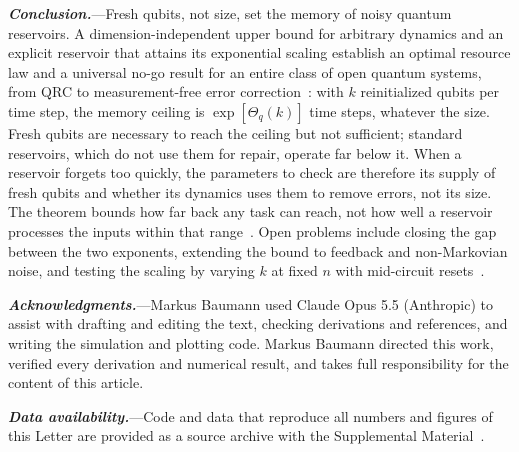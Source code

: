 \documentclass[aps,prl,twocolumn,superscriptaddress,floatfix]{revtex4-2}
\theoremstyle{plain}
\newcommand{\runin}[1]{\textit{\textbf{#1}}---}
\begin{document}
\runin{Conclusion.}Fresh qubits, not size, set the memory of noisy quantum reservoirs. A dimension-independent upper bound for arbitrary dynamics and an explicit reservoir that attains its exponential scaling establish an optimal resource law and a universal no-go result for an entire class of open quantum systems, from QRC to measurement-free error correction~\cite{Heussen2024}: with $k$ reinitialized qubits per time step, the memory ceiling is $\exp[\Theta_q(k)]$ time steps, whatever the size. Fresh qubits are necessary to reach the ceiling but not sufficient; standard reservoirs, which do not use them for repair, operate far below it. When a reservoir forgets too quickly, the parameters to check are therefore its supply of fresh qubits and whether its dynamics uses them to remove errors, not its size. The theorem bounds how far back any task can reach, not how well a reservoir processes the inputs within that range~\cite{Cao2026}. Open problems include closing the gap between the two exponents, extending the bound to feedback and non-Markovian noise, and testing the scaling by varying $k$ at fixed $n$ with mid-circuit resets~\cite{Yasuda2023,Hu2024}.

\begin{acknowledgments}
\runin{Acknowledgments.}Markus Baumann used Claude Opus 5.5 (Anthropic) to assist with drafting and editing the text, checking derivations and references, and writing the simulation and plotting code. Markus Baumann directed this work, verified every derivation and numerical result, and takes full responsibility for the content of this article.
\end{acknowledgments}

\runin{Data availability.}Code and data that reproduce all numbers and figures of this Letter are provided as a source archive with the Supplemental Material~\cite{SM}.

\nocite{vonNeumann1956,Nelson2026,Xiong2025}

\end{document}
